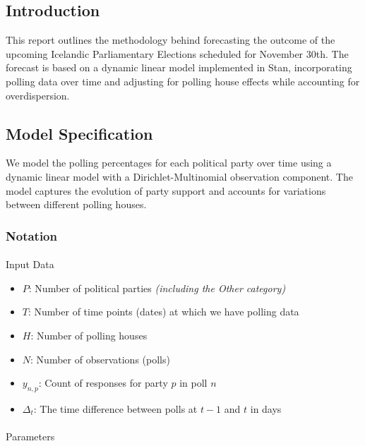 \documentclass[
  letterpaper,
  DIV=11,
  numbers=noendperiod,
  oneside]{scrartcl}
\author{}
\date{}
\makeatletter
\let\oldparagraph\paragraph
\renewcommand{\paragraph}{
    \@ifstar
      \xxxParagraphStar
      \xxxParagraphNoStar
  }
\newcommand{\xxxParagraphStar}[1]{\oldparagraph*{#1}\mbox{}}
\newcommand{\xxxParagraphNoStar}[1]{\oldparagraph{#1}\mbox{}}
\providecommand{\tightlist}{%
  \setlength{\itemsep}{0pt}\setlength{\parskip}{0pt}}\usepackage{longtable,booktabs,array}
\makeatother
\begin{document}
\subsection{Introduction}\label{introduction}

This report outlines the methodology behind forecasting the outcome of
the upcoming Icelandic Parliamentary Elections scheduled for November
30th. The forecast is based on a dynamic linear model implemented in
Stan, incorporating polling data over time and adjusting for polling
house effects while accounting for overdispersion.

\subsection{Model Specification}\label{model-specification}

We model the polling percentages for each political party over time
using a dynamic linear model with a Dirichlet-Multinomial observation
component. The model captures the evolution of party support and
accounts for variations between different polling houses.

\subsubsection{Notation}\label{notation}

\paragraph{Input Data}\label{input-data}

\begin{itemize}
\tightlist
\item
  \(P\): Number of political parties \emph{(including the Other
  category)}
\item
  \(T\): Number of time points (dates) at which we have polling data
\item
  \(H\): Number of polling houses
\item
  \(N\): Number of observations (polls)
\item
  \(y_{n,p}\): Count of responses for party \(p\) in poll \(n\)
\item
  \(\Delta_t\): The time difference between polls at \(t-1\) and \(t\)
  in days
\end{itemize}

\paragraph{Parameters}\label{parameters}
\end{document}
